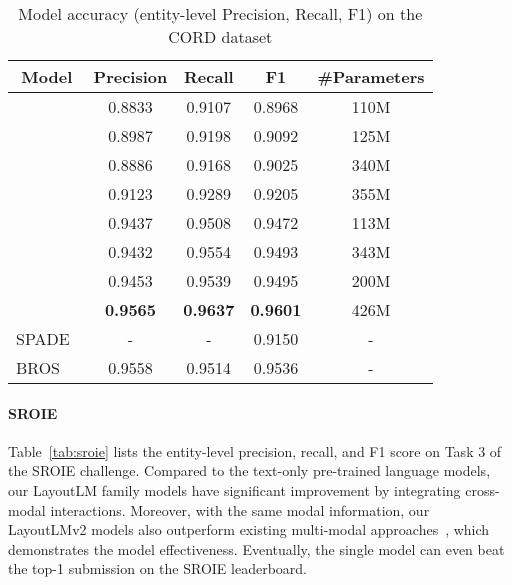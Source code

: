 \documentclass{article} \usepackage{iclr2021_conference,times}
\begin{document}
\begin{table}[ht]
    \centering
    \small
    \begin{tabular}{lcccc}
    \toprule
     \multicolumn{1}{c}{\bf Model} & \bf Precision & \bf Recall & \bf F1 & \bf \#Parameters\\
     \midrule
      & 0.8833 & 0.9107 & 0.8968 & 110M\\
      & 0.8987 & 0.9198 & 0.9092 & 125M \\
      & 0.8886 & 0.9168 & 0.9025 & 340M\\
      & 0.9123 & 0.9289 & 0.9205 & 355M \\
     \midrule
      & 0.9437 & 0.9508 & 0.9472 & 113M\\
      & 0.9432 & 0.9554 & 0.9493 & 343M\\
     \midrule
      & 0.9453 & 0.9539 & 0.9495 & 200M \\
      & \bf 0.9565 & \bf 0.9637 & \bf 0.9601 & 426M \\
     \midrule\midrule
     SPADE~\citep{hwang2020spatial} & - & - & 0.9150 & - \\
     BROS~\citep{anonymous2021bros} & 0.9558 & 0.9514 & 0.9536 & - \\
     \bottomrule
    \end{tabular}
    \caption{Model accuracy (entity-level Precision, Recall, F1) on the CORD dataset}
    \label{tab:cord}
\end{table}




\paragraph{SROIE}
Table~\ref{tab:sroie} lists the entity-level precision, recall, and F1 score on Task 3 of the SROIE challenge. Compared to the text-only pre-trained language models, our LayoutLM family models have significant improvement by integrating cross-modal interactions. Moreover, with the same modal information, our LayoutLMv2 models also outperform existing multi-modal approaches~\citep{anonymous2021bros, yu2020pick, zhang2020trie}, which demonstrates the model effectiveness. Eventually, the  single model can even beat the top-1 submission on the SROIE leaderboard.
\end{document}
